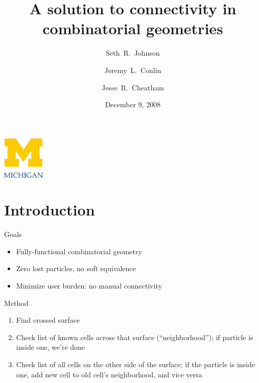 \documentclass[color={usenames, dvipsnames},ignorenonframetext]{beamer}
\title[MCGeometry]%
{A solution to connectivity in combinatorial geometries}
\author[SRJ, JLC, JRC]{Seth~R.~Johnson \and Jeremy~L.~Conlin \and Jesse~R.~Cheatham}
\institute[UM]{
University of Michigan, Ann Arbor
}
\date[Project presentation]{December 9, 2008}
\begin{document}

\begin{frame}
\titlepage
\begin{center}
  \includegraphics[width=2cm]{umlogo}
\end{center}
\end{frame}

\section{Introduction}
\begin{frame}{Goals}
\begin{itemize}
  \item Fully-functional combinatorial geometry
  \item Zero lost particles, no soft equivalence
  \item Minimize user burden: no manual connectivity
\end{itemize}
\end{frame}
\begin{frame}{Method}
\begin{enumerate}
  \item Find crossed surface
  \item Check list of known cells across that surface (``neighborhood'');
    if particle is inside one, we're done
  \item Check list of all cells on the other side of the surface; if the
    particle is inside one, add new cell to old cell's neighborhood, and
    vice versa
\end{enumerate}
\end{frame}

\end{document}
